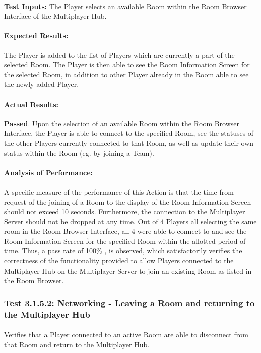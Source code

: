 \documentclass{article}
\begin{document}
    \paragraph{}\textbf{Test Inputs:} The Player selects an available Room within the Room Browser Interface of the Multiplayer Hub.
    \paragraph{Expected Results:} The Player is added to the list of Players which are currently a part of the selected Room. The Player is then able to see the Room Information Screen for the selected Room, in addition to other Player already in the Room able to see the newly-added Player. 
    \paragraph{Actual Results:} \textbf{Passed}. Upon the selection of an available Room within the Room Browser Interface, the Player is able to connect to the specified Room, see the statuses of the other Players currently connected to that Room, as well as update their own status within the Room (eg. by joining a Team).
    \paragraph{Analysis of Performance:} A specific measure of the performance of this Action is that the time from request of the joining of a Room to the display of the Room Information Screen should not exceed 10 seconds. Furthermore, the connection to the Multiplayer Server should not be dropped at any time. Out of 4 Players all selecting the same room in the Room Browser Interface, all 4 were able to connect to and see the Room Information Screen for the specified Room within the allotted period of time.  Thus, a pass rate of 100\% , is observed, which satisfactorily verifies the correctness of the functionality provided to allow Players connected to the Multiplayer Hub on the Multiplayer Server to join an existing Room as listed in the Room Browser.
    
    \subsubsection{Test 3.1.5.2: Networking - Leaving a Room and returning to the Multiplayer Hub}
    \paragraph{} Verifies that a Player connected to an active Room are able to disconnect from that Room and return to the Multiplayer Hub.
\end{document}
